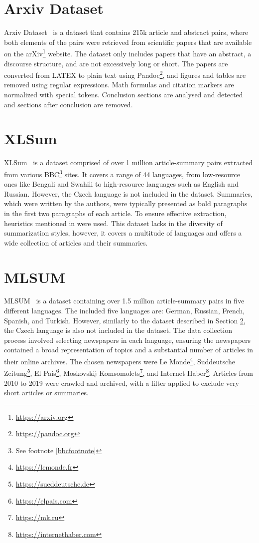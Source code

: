 \documentclass[english, ba, kiv, he, iso690numb, pdf, viewonly]{fasthesis}
\begin{document}
\section{Arxiv Dataset}
Arxiv Dataset~\cite{cohan2018discourseaware} is a dataset that contains 215k article and abstract pairs, where both elements of the pairs were retrieved from scientific papers that are available on the arXiv\footnote{\url{https://arxiv.org}} website. The dataset only includes papers that have an abstract, a discourse structure, and are not excessively long or short. The papers are converted from LATEX to plain text using Pandoc\footnote{\url{https://pandoc.org}}, and figures and tables are removed using regular expressions. Math formulas and citation markers are normalized with special tokens. Conclusion sections are analysed and detected and sections after conclusion are removed.

\section{XLSum} \label{xlsum}
XLSum~\cite{hasan-etal-2021-xl} is a dataset comprised of over 1 million article-summary pairs extracted from various BBC\footnote{See footnote \ref{bbcfootnote}} sites. It covers a range of 44 languages, from low-resource ones like Bengali and Swahili to high-resource languages such as English and Russian. However, the Czech language is not included in the dataset. Summaries, which were written by the authors, were typically presented as bold paragraphs in the first two paragraphs of each article. To ensure effective extraction, heuristics mentioned in \cite{hasan-etal-2021-xl} were used. This dataset lacks in the diversity of summarization styles, however, it covers a multitude of languages and offers a wide collection of articles and their summaries.

\section{MLSUM}
MLSUM~\cite{scialom2020mlsum} is a dataset containing over 1.5 million article-summary pairs in five different languages. The included five languages are: German, Russian, French, Spanish, and Turkish. However, similarly to the dataset described in Section \ref{xlsum}, the Czech language is also not included in the dataset. The data collection process involved selecting newspapers in each language, ensuring the newspapers contained a broad representation of topics and a substantial number of articles in their online archives. The chosen newspapers were Le Monde\footnote{\url{https://lemonde.fr}}, Suddeutsche Zeitung\footnote{\url{https://sueddeutsche.de}}, El Pais\footnote{\url{https://elpais.com}}, Moskovskij Komsomolets\footnote{\url{https://mk.ru}}, and Internet Haber\footnote{\url{https://internethaber.com}}. Articles from 2010 to 2019 were crawled and archived, with a filter applied to exclude very short articles or summaries.
\end{document}
